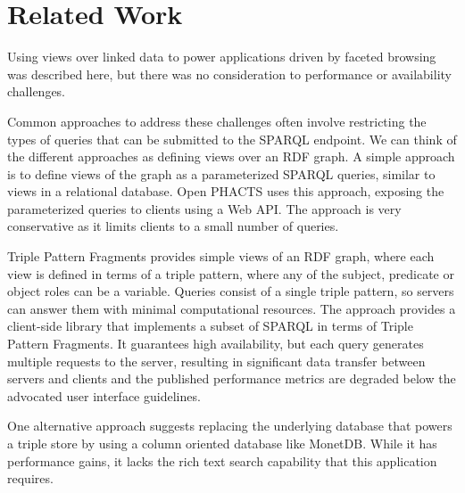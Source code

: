 \section{Related Work}
\label{sec:related-work}

Using views over linked data to power applications driven by faceted browsing was described here\cite{erling2009faceted}, but there was no consideration to performance or availability challenges. 

Common approaches to address these challenges often involve restricting the types of queries that can be submitted to the SPARQL endpoint.
We can think of the different approaches as defining views over an RDF graph.
A simple approach is to define views of the graph as a parameterized SPARQL queries, similar to views in a relational database.
Open PHACTS\cite{Loizou_Angles_Groth_2014} uses this approach, exposing the parameterized queries to clients using a Web API.
The approach is very conservative as it limits clients to a small number of queries.

Triple Pattern Fragments \cite{Verborgh2014} provides simple views of an RDF graph, where each view is defined in terms of a triple pattern, where any of the subject, predicate or object roles can be a variable.
Queries consist of a single triple pattern, so servers can answer them with minimal computational resources.
The approach provides a client-side library that implements a subset of SPARQL in terms of Triple Pattern Fragments.
It guarantees high availability, but each query generates multiple requests to the server, resulting in significant data transfer between servers and clients and the published performance metrics are degraded below the advocated user interface guidelines. 

One alternative approach suggests replacing the underlying database that powers a triple store by using a column oriented database like MonetDB\cite{Wang_Wang_Du_Feng_2010}.   While it has performance gains, it lacks the rich text search capability that this application requires.